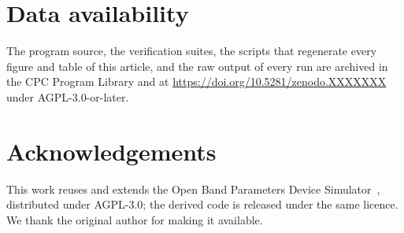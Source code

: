 \documentclass[preprint,12pt]{elsarticle}
\begin{document}
\section*{Data availability}
The program source, the verification suites, the scripts that regenerate every
figure and table of this article, and the raw output of every run are archived
in the CPC Program Library and at \url{https://doi.org/10.5281/zenodo.XXXXXXX}
under AGPL-3.0-or-later.

\section*{Acknowledgements}
This work reuses and extends the Open Band Parameters Device
Simulator~\cite{Maddox2015}, distributed under AGPL-3.0; the derived code is
released under the same licence. We thank the original author for making it
available.



\end{document}
